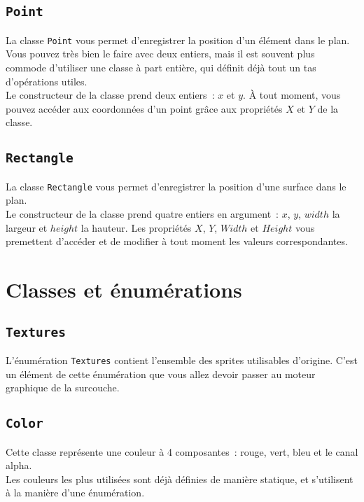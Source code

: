 \subsection{\texttt{Point}}

La classe \texttt{Point} vous permet d'enregistrer la position d'un élément dans le plan. Vous pouvez très bien le faire avec deux entiers, mais il est souvent plus commode d'utiliser une classe à part entière, qui définit déjà tout un tas d'opérations utiles.\\

Le constructeur de la classe prend deux entiers~: $x$ et $y$. À tout moment, vous pouvez accéder aux coordonnées d'un point grâce aux propriétés $X$ et $Y$ de la classe.

\subsection{\texttt{Rectangle}}

La classe \texttt{Rectangle} vous permet d'enregistrer la position d'une surface dans le plan.\\

Le constructeur de la classe prend quatre entiers en argument~: $x$, $y$, $width$ la largeur et $height$ la hauteur. Les propriétés $X$, $Y$, $Width$ et $Height$ vous premettent d'accéder et de modifier à tout moment les valeurs correspondantes.


\section{Classes et énumérations}

\subsection{\texttt{Textures}}

L'énumération \texttt{Textures} contient l'ensemble des sprites utilisables d'origine. C'est un élément de cette énumération que vous allez devoir passer au moteur graphique de la surcouche.

\subsection{\texttt{Color}}

Cette classe représente une couleur à 4 composantes~: rouge, vert, bleu et le canal alpha.\\

Les couleurs les plus utilisées sont déjà définies de manière statique, et s'utilisent à la manière d'une énumération.

